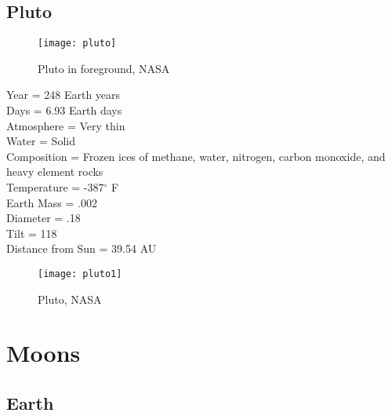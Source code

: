 \documentclass[12pt]{book}
\begin{document}
\section{Pluto}
 \begin{wrapfigure}{R}{0.4\textwidth}
         \vspace{-1cm}
        \begin{center}
        \texttt{[image: pluto]}\caption{\scriptsize Pluto in foreground, NASA}
        \end{center}
         \vspace{-1cm}
    \end{wrapfigure}
Year = 248 Earth years\\
Days = 6.93 Earth days\\
Atmosphere = Very thin\\
Water = Solid\\
Composition = Frozen ices of methane, water, nitrogen, carbon monoxide, and heavy element rocks\\
Temperature = -387$^{\circ}$ F\\
Earth Mass = .002\\
Diameter = .18\\ 
Tilt = 118\\
Distance from Sun = 39.54 AU\\ \begin{wrapfigure}{R}{0.4\textwidth}
         \vspace{-1cm}
        \begin{center}
        \texttt{[image: pluto1]}\caption{\scriptsize Pluto, NASA}
        \end{center}
         \vspace{-1cm}
    \end{wrapfigure}
\chapter{Moons}
\section{Earth}
\end{document}
